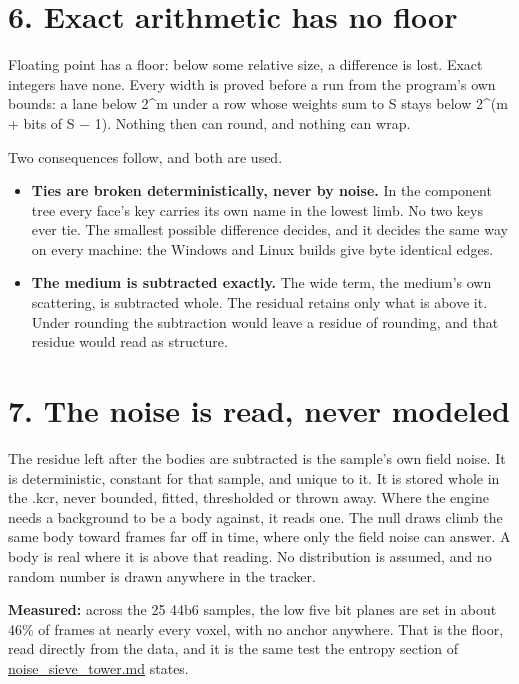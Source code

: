 \section{\texorpdfstring{6. Exact arithmetic has no floor}{6. Exact arithmetic has no floor}}

Floating point has a floor: below some relative size, a difference is lost. Exact integers have none. Every width is proved before a run from the program's own bounds: a lane below 2\textasciicircum{}m under a row whose weights sum to S stays below 2\textasciicircum{}(m + bits of S − 1). Nothing then can round, and nothing can wrap.

Two consequences follow, and both are used.

\begin{itemize}
\item \textbf{Ties are broken deterministically, never by noise.} In the component tree every face's key carries its own name in the lowest limb. No two keys ever tie. The smallest possible difference decides, and it decides the same way on every machine: the Windows and Linux builds give byte identical edges.
\item \textbf{The medium is subtracted exactly.} The wide term, the medium's own scattering, is subtracted whole. The residual retains only what is above it. Under rounding the subtraction would leave a residue of rounding, and that residue would read as structure.
\end{itemize}

\section{\texorpdfstring{7. The noise is read, never modeled}{7. The noise is read, never modeled}}

The residue left after the bodies are subtracted is the sample's own field noise. It is deterministic, constant for that sample, and unique to it. It is stored whole in the .kcr, never bounded, fitted, thresholded or thrown away. Where the engine needs a background to be a body against, it reads one. The null draws climb the same body toward frames far off in time, where only the field noise can answer. A body is real where it is above that reading. No distribution is assumed, and no random number is drawn anywhere in the tracker.

\textbf{Measured:} across the 25 44b6 samples, the low five bit planes are set in about 46\% of frames at nearly every voxel, with no anchor anywhere. That is the floor, read directly from the data, and it is the same test the entropy section of \hyperref[chap:noise-sieve-tower]{noise\_\allowbreak{}sieve\_\allowbreak{}tower.md} states.


